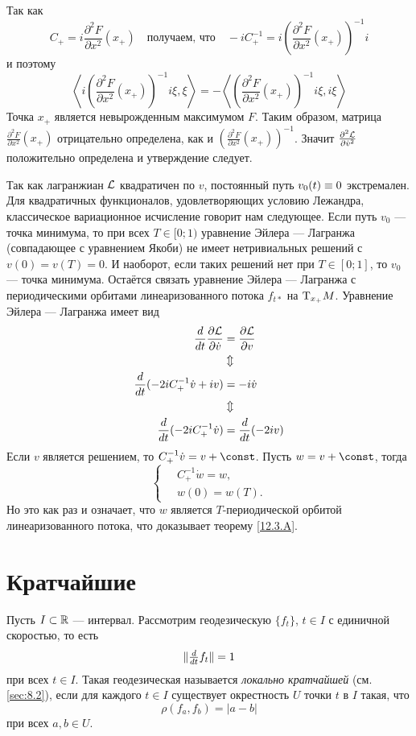 Так как 
\[C_+=i\frac{\partial^2F}{\partial x^2}(x_+)
\quad\text{получаем, что}\quad
-iC_+^{-1}=i\left(\frac{\partial^2F}{\partial x^2}(x_+)\right)^{-1}i\]
и поэтому 
\[
\left\langle i\left(\frac{\partial^2F}{\partial x^2}(x_+)\right)^{-1}i\xi,\xi\right\rangle
=
-\left\langle \left(\frac{\partial^2F}{\partial x^2}(x_+)\right)^{-1}i\xi,i\xi\right\rangle
\]
Точка $x_+$ является невырожденным максимумом $F$.
Таким образом, матрица $\frac{\partial^2F}{\partial x^2}(x_+)$
отрицательно определена, как и $\left(\frac{\partial^2F}{\partial x^2}(x_+)\right)^{-1}$.
Значит $\tfrac{\partial^2\mathcal{L}}{\partial\dot v^2}$ положительно определена и утверждение следует.

Так как лагранжиан $\mathcal{L}$ квадратичен по $v$, постоянный путь $v_0(t) \z\equiv 0$ экстремален.
Для квадратичных функционалов, удовлетворяющих условию Лежандра, классическое вариационное исчисление говорит нам следующее.
Если путь $v_0$ — точка минимума, то при всех $T \in [0;1)$ уравнение Эйлера — Лагранжа (совпадающее с уравнением Якоби) не имеет нетривиальных решений с $v(0) = v(T) = 0$.
И наоборот, если таких решений нет при $T\in[0;1]$, то $v_0$ — точка минимума.
Остаётся связать уравнение Эйлера — Лагранжа с периодическими орбитами линеаризованного потока $f_{t*}$ на $\mathrm{T}_{x_+}M$.
Уравнение Эйлера — Лагранжа имеет вид
\begin{align*}
\frac{d}{d t}\frac{\partial \mathcal{L}}{\partial \dot v}
&=\frac{\partial \mathcal{L}}{\partial v}
\\
&\Updownarrow
\\
\frac{d}{d t}(-2iC_+^{-1}\dot v+iv)
&=-i\dot v
\\
&\Updownarrow
\\
\frac{d}{d t}(-2iC_+^{-1}\dot v)
&=
\frac{d}{d t}(-2iv)
\end{align*}
Если $v$ является решением, то $C_+^{-1}\dot v = v + \const$.
Пусть $w = v + \const$, тогда 
\[
\begin{cases}
\quad C_+^{-1}\dot w=w,
\\
\quad w(0)=w(T).
\end{cases}
\]
Но это как раз и означает, что $w$ является $T$-периодической орбитой линеаризованного потока, что доказывает теорему \ref{12.3.A}.
\qeds


\section{Кратчайшие}
Пусть $I \subset \mathbb{R}$ — интервал.
Рассмотрим геодезическую $\{f_t\}$, $t\in I$ с единичной скоростью, то есть
\[\|\tfrac{d}{d t}f_t\|=1\]
при всех $t\in I$.
Такая геодезическая называется \emph{локально кратчайшей} %
(см. \ref{sec:8.2}), если для каждого $t\in I$ существует окрестность $U$ точки $t$ в $I$ такая, что  
\[\rho(f_a,f_b)=|a-b|\]
при всех $a,b\in U$.

